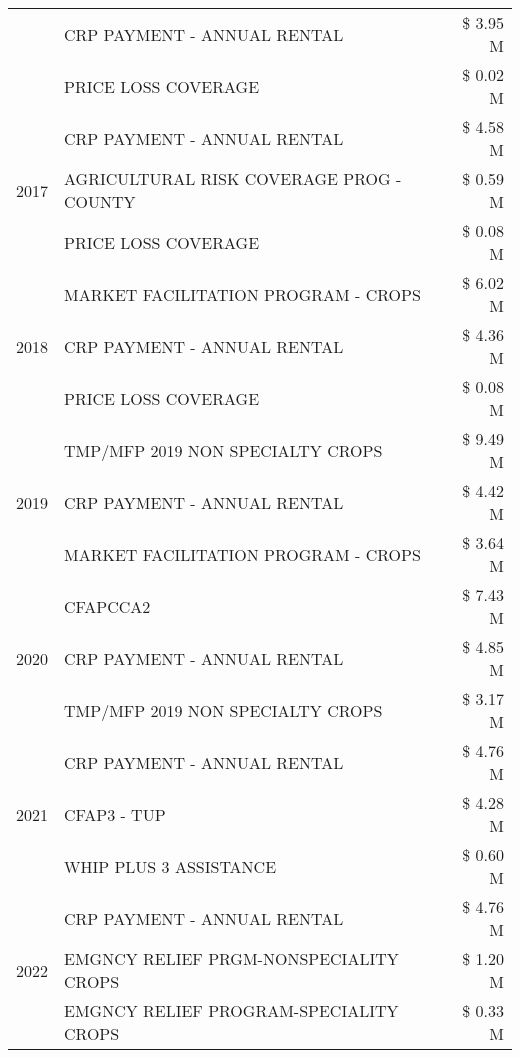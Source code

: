 \begin{tabular}{llr}
 & CRP PAYMENT - ANNUAL RENTAL & \$ 3.95 M \\
 & PRICE LOSS COVERAGE & \$ 0.02 M \\
\cline{1-3}
\multirow[t]{3}{*}{2017} & CRP PAYMENT - ANNUAL RENTAL & \$ 4.58 M \\
 & AGRICULTURAL RISK COVERAGE PROG - COUNTY & \$ 0.59 M \\
 & PRICE LOSS COVERAGE & \$ 0.08 M \\
\cline{1-3}
\multirow[t]{3}{*}{2018} & MARKET FACILITATION PROGRAM - CROPS & \$ 6.02 M \\
 & CRP PAYMENT - ANNUAL RENTAL & \$ 4.36 M \\
 & PRICE LOSS COVERAGE & \$ 0.08 M \\
\cline{1-3}
\multirow[t]{3}{*}{2019} & TMP/MFP 2019 NON SPECIALTY CROPS & \$ 9.49 M \\
 & CRP PAYMENT - ANNUAL RENTAL & \$ 4.42 M \\
 & MARKET FACILITATION PROGRAM - CROPS & \$ 3.64 M \\
\cline{1-3}
\multirow[t]{3}{*}{2020} & CFAPCCA2 & \$ 7.43 M \\
 & CRP PAYMENT - ANNUAL RENTAL & \$ 4.85 M \\
 & TMP/MFP 2019 NON SPECIALTY CROPS & \$ 3.17 M \\
\cline{1-3}
\multirow[t]{3}{*}{2021} & CRP PAYMENT - ANNUAL RENTAL & \$ 4.76 M \\
 & CFAP3 - TUP & \$ 4.28 M \\
 & WHIP PLUS 3 ASSISTANCE & \$ 0.60 M \\
\cline{1-3}
\multirow[t]{3}{*}{2022} & CRP PAYMENT - ANNUAL RENTAL & \$ 4.76 M \\
 & EMGNCY RELIEF PRGM-NONSPECIALITY CROPS & \$ 1.20 M \\
 & EMGNCY RELIEF PROGRAM-SPECIALITY CROPS & \$ 0.33 M \\
\cline{1-3}
\bottomrule
\end{tabular}

